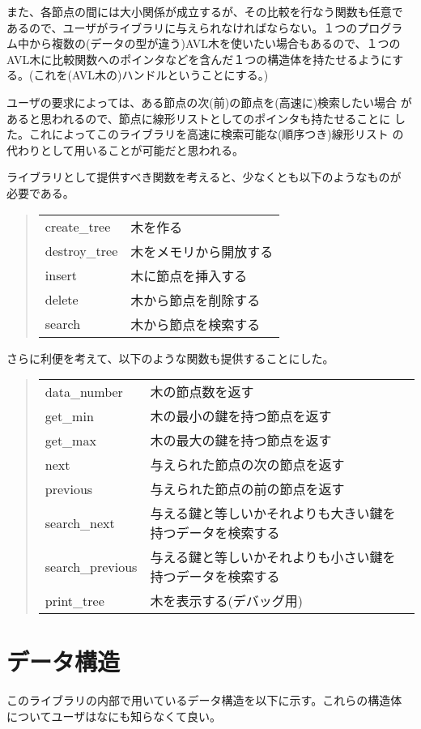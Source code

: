 また、各節点の間には大小関係が成立するが、その比較を行なう関数も任意で
あるので、ユーザがライブラリに与えられなければならない。１つのプログラ
ム中から複数の(データの型が違う)AVL木を使いたい場合もあるので、１つの
AVL木に比較関数へのポインタなどを含んだ１つの構造体を持たせるようにす
る。(これを(AVL木の)ハンドルということにする。)

ユーザの要求によっては、ある節点の次(前)の節点を(高速に)検索したい場合
があると思われるので、節点に線形リストとしてのポインタも持たせることに
した。これによってこのライブラリを高速に検索可能な(順序つき)線形リスト
の代わりとして用いることが可能だと思われる。

ライブラリとして提供すべき関数を考えると、少なくとも以下のようなものが
必要である。

\begin{quote}
\begin{tabular}{ll}
create\_tree	&木を作る\\
destroy\_tree	&木をメモリから開放する\\
insert		&木に節点を挿入する\\
delete		&木から節点を削除する\\
search		&木から節点を検索する\\
\end{tabular}
\end{quote}

さらに利便を考えて、以下のような関数も提供することにした。

\begin{quote}
\begin{tabular}{ll}
data\_number	&木の節点数を返す\\
get\_min	&木の最小の鍵を持つ節点を返す\\
get\_max	&木の最大の鍵を持つ節点を返す\\
next		&与えられた節点の次の節点を返す\\
previous	&与えられた節点の前の節点を返す\\
search\_next	&与える鍵と等しいかそれよりも大きい鍵を持つデータを検索する\\
search\_previous &与える鍵と等しいかそれよりも小さい鍵を持つデータを検索する\\
print\_tree	&木を表示する(デバッグ用)\\
\end{tabular}
\end{quote}

\section{データ構造}
このライブラリの内部で用いているデータ構造を以下に示す。これらの構造体
についてユーザはなにも知らなくて良い。

